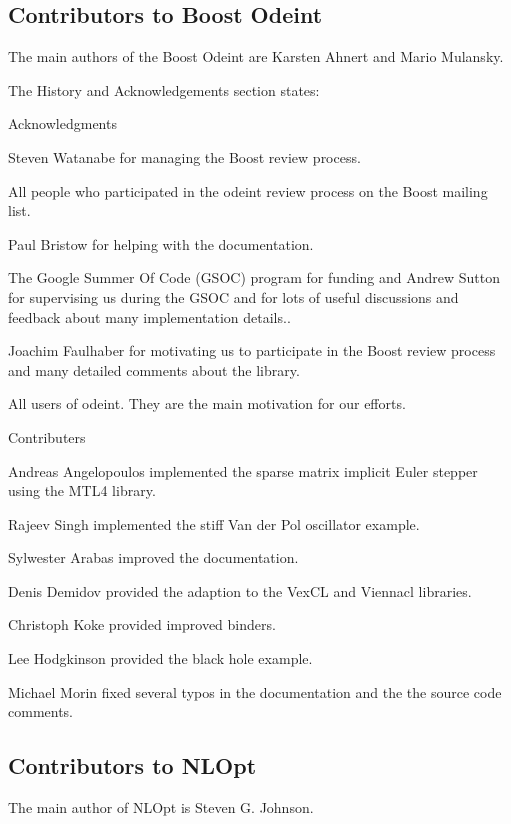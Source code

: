 \subsection{Contributors to Boost Odeint}
\label{Contributors to Boost Odeint}
The main authors of the Boost Odeint are Karsten Ahnert  and Mario Mulansky.

\vpara
The History and Acknowledgements section states:

\vpara
Acknowledgments 

Steven Watanabe for managing the Boost review process. 

All people who participated in the odeint review process on the Boost mailing list. 

Paul Bristow for helping with the documentation. 

The Google Summer Of Code (GSOC) program for funding and Andrew Sutton for supervising us during the GSOC and for lots of useful discussions and feedback about many implementation details.. 

Joachim Faulhaber for motivating us to participate in the Boost review process and many detailed comments about the library. 

All users of odeint. They are the main motivation for our efforts. 

\vpara
 Contributers 

Andreas Angelopoulos implemented the sparse matrix implicit Euler stepper using the MTL4 library. 

Rajeev Singh implemented the stiff Van der Pol oscillator example. 

Sylwester Arabas improved the documentation. 

Denis Demidov provided the adaption to the VexCL and Viennacl libraries. 

Christoph Koke provided improved binders. 

Lee Hodgkinson provided the black hole example. 

Michael Morin fixed several typos in the documentation and the the source code comments. 

  





\subsection{Contributors to NLOpt}
\label{Contributors to NLOpt}
The main author of NLOpt is Steven G. Johnson.

